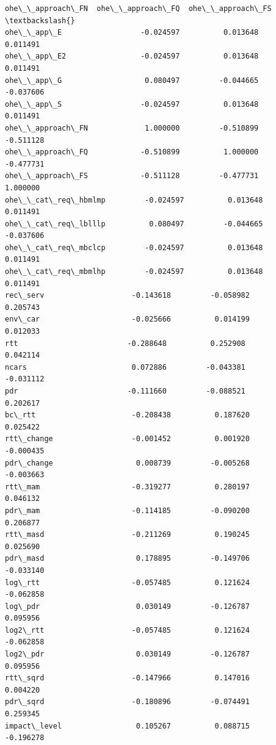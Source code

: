 \documentclass[11pt]{article}
\begin{document}
\begin{tcolorbox}[breakable, size=fbox, boxrule=.5pt, pad at break*=1mm, opacityfill=0]
\begin{Verbatim}[commandchars=\\\{\}]
                     ohe\_\_approach\_FN  ohe\_\_approach\_FQ  ohe\_\_approach\_FS  \textbackslash{}
ohe\_\_app\_E                  -0.024597          0.013648          0.011491
ohe\_\_app\_E2                 -0.024597          0.013648          0.011491
ohe\_\_app\_G                   0.080497         -0.044665         -0.037606
ohe\_\_app\_S                  -0.024597          0.013648          0.011491
ohe\_\_approach\_FN             1.000000         -0.510899         -0.511128
ohe\_\_approach\_FQ            -0.510899          1.000000         -0.477731
ohe\_\_approach\_FS            -0.511128         -0.477731          1.000000
ohe\_\_cat\_req\_hbmlmp         -0.024597          0.013648          0.011491
ohe\_\_cat\_req\_lblllp          0.080497         -0.044665         -0.037606
ohe\_\_cat\_req\_mbclcp         -0.024597          0.013648          0.011491
ohe\_\_cat\_req\_mbmlhp         -0.024597          0.013648          0.011491
rec\_serv                    -0.143618         -0.058982          0.205743
env\_car                     -0.025666          0.014199          0.012033
rtt                         -0.288648          0.252908          0.042114
ncars                        0.072886         -0.043381         -0.031112
pdr                         -0.111660         -0.088521          0.202617
bc\_rtt                      -0.208438          0.187620          0.025422
rtt\_change                  -0.001452          0.001920         -0.000435
pdr\_change                   0.008739         -0.005268         -0.003663
rtt\_mam                     -0.319277          0.280197          0.046132
pdr\_mam                     -0.114185         -0.090200          0.206877
rtt\_masd                    -0.211269          0.190245          0.025690
pdr\_masd                     0.178895         -0.149706         -0.033140
log\_rtt                     -0.057485          0.121624         -0.062858
log\_pdr                      0.030149         -0.126787          0.095956
log2\_rtt                    -0.057485          0.121624         -0.062858
log2\_pdr                     0.030149         -0.126787          0.095956
rtt\_sqrd                    -0.147966          0.147016          0.004220
pdr\_sqrd                    -0.180896         -0.074491          0.259345
impact\_level                 0.105267          0.088715         -0.196278


\end{Verbatim}
\end{tcolorbox}
\end{document}
